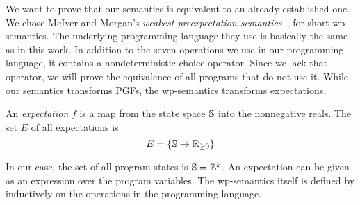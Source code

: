 We want to prove that our semantics is equivalent to an already established one.
We chose McIver and Morgan's \emph{weakest preexpectation semantics}~\cite{mciver:abstraction_refinement}, for short wp-semantics.
The underlying programming language they use is basically the same as in this work.
In addition to the seven operations we use in our programming language, it contains a nondeterministic choice operator.
Since we lack that operator, we will prove the equivalence of all programs that do not use it.
While our semantics transforms PGFs, the wp-semantics transforms expectations.

\begin{definition}
	An \emph{expectation} $f$ is a map from the state space $\S$ into the nonnegative reals.
	The set $E$ of all expectations is \[ E = \{ \S \to \R_{\geq 0} \} \]
\end{definition}
In our case, the set of all program states is $\S = \Z^k$.
An expectation can be given as an expression over the program variables.
The wp-semantics itself is defined by inductively on the operations in the programming language.

